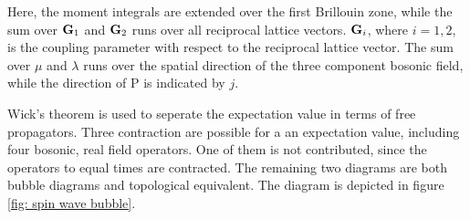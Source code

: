 %
Here, the moment integrals are extended over the first Brillouin zone, while the sum over $\vb{G}_{1}$ and $\vb{G}_{2}$ runs over all reciprocal lattice vectors.
$\vb{G}_{i}$, where $i=1,2$, is the coupling parameter with respect to the reciprocal lattice vector.
The sum over $\mu$ and $\lambda$ runs over the spatial direction of the three component bosonic field, while the direction of P is indicated by $j$.

Wick's theorem is used to seperate the expectation value in terms of free propagators.
Three contraction are possible for a an expectation value, including four bosonic, real field operators.
One of them is not contributed, since the operators to equal times are contracted.
The remaining two diagrams are both bubble diagrams and topological equivalent.
The diagram is depicted in figure \ref{fig: spin wave bubble}.

